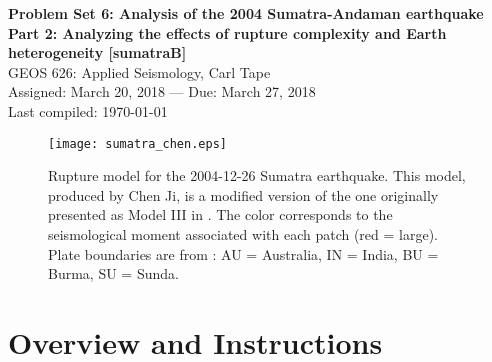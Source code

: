 \documentclass[11pt,titlepage,fleqn]{article}
\begin{document}

\begin{spacing}{1.2} 
\centering
{\large \bf Problem Set 6: Analysis of the 2004 Sumatra-Andaman earthquake \\
Part 2: Analyzing the effects of rupture complexity and Earth heterogeneity [sumatraB]} \\
GEOS 626: Applied Seismology, Carl Tape \\
Assigned: March 20, 2018 --- Due: March 27, 2018 \\
Last compiled: \today
\end{spacing}


\begin{figure}[h]
\centering
\texttt{[image: sumatra\_chen.eps]}
\caption[]
{{
Rupture model for the 2004-12-26  Sumatra earthquake.
This model, produced by Chen Ji, is a modified version of the one originally presented as Model III in \citet[][Figure~5c]{Ammon2005}.
The color corresponds to the seismological moment associated with each patch (red = large).
Plate boundaries are from \citet{Bird2003}: AU = Australia, IN = India, BU = Burma, SU = Sunda.
}}
\label{fig:sumatra_chen}
\end{figure}


\clearpage\pagebreak
\section*{Overview and Instructions}
\end{document}
